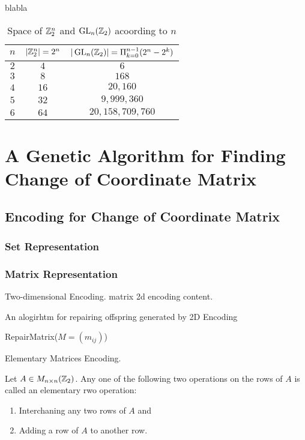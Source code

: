 \par blabla
\begin{table}[H]
  \caption{Space of $ \mathbb{Z}_2^n $ and $ \operatorname{GL}_n(\mathbb{Z}_2) $ acoording to $ n $}
  \label{tab:space}
  \begin{adjustbox}{max width=\textwidth}
  \begin{tabular}{ccc}
    \toprule
    $ n $  &  $ | \mathbb{Z}_2^n | = 2^n $  &  $ | \operatorname{GL}_n(\mathbb{Z}_2) | = \Pi_{k=0}^{n-1}{(2^n - 2^k)} $  \\
    \midrule
    $ 2 $  &  $  4  $  &  $ 6 $                      \\
    $ 3 $  &  $  8  $  &  $ 168 $                    \\
    $ 4 $  &  $ 16  $  &  $ 20,160 $                 \\
    $ 5 $  &  $ 32  $  &  $ 9,999,360 $              \\
    $ 6 $  &  $ 64  $  &  $ 20,158,709,760 $         \\
  \bottomrule
  \end{tabular}
  \end{adjustbox}
\end{table}


\section{A Genetic Algorithm for Finding Change of Coordinate Matrix}

\subsection{Encoding for Change of Coordinate Matrix}

\subsubsection{Set Representation}

\subsubsection{Matrix Representation}
Two-dimensional Encoding.
matrix 2d encoding content.
\SetAlCapSkip{1em}
\begin{algorithm}[ht]
    \caption{An alogirhtm for repairing offspring generated by 2D Encoding}
    RepairMatrix($M=(m_{ij})$)
\end{algorithm}

Elementary Matrices Encoding.
\begin{definition}
    Let $ A \in M_{n \times n}(\mathbb{Z}_2) $. Any one of the following two operations on the rows of $ A $ is called an elementary rwo operation:
    \begin{enumerate}
        \item Interchaning any two rows of $ A $ and
        \item Adding a row of $ A $ to another row.
    \end{enumerate}
\end{definition}



